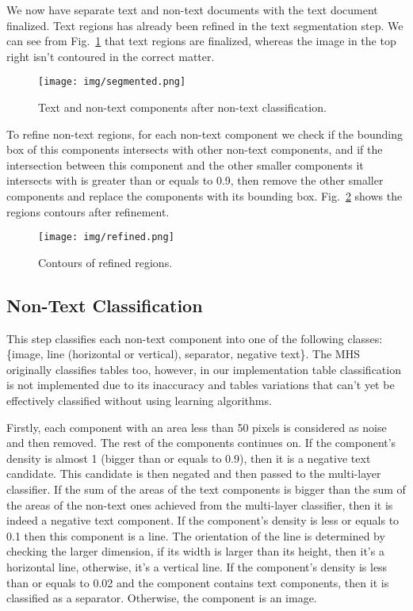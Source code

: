 \documentclass[conference]{IEEEtran}
\begin{document}
    We now have separate text and non-text documents with the text document finalized.
    Text regions has already been refined in the text segmentation step.
    We can see from Fig.~\ref{img:segmented} that text regions are finalized,
    whereas the image in the top right isn't contoured in the correct matter.

    \begin{figure}[htbp]
        \centerline{\texttt{[image: img/segmented.png]}}
        \caption{Text and non-text components after non-text classification.}
        \label{img:segmented}
    \end{figure}

    To refine non-text regions, for each non-text component we check if the bounding
    box of this components intersects with other non-text components, and if the
    intersection between this component and the other smaller components it intersects
    with is greater than or equals to 0.9, then remove the other smaller components and
    replace the components with its bounding box. Fig.~\ref{img:refined} shows the
    regions contours after refinement.

    \begin{figure}[htbp]
        \centerline{\texttt{[image: img/refined.png]}}
        \caption{Contours of refined regions.}
        \label{img:refined}
    \end{figure}

    \subsection{Non-Text Classification}

    This step classifies each non-text component into one of the following classes:
    \{image, line (horizontal or vertical), separator, negative text\}.
    The MHS originally classifies tables too, however, in our implementation table
    classification is not implemented due to its inaccuracy and tables variations
    that can't yet be effectively classified without using learning algorithms.
    
    Firstly, each component with an area less than 50 pixels is considered as noise
    and then removed.
    The rest of the components continues on.
    If the component's density is almost 1 (bigger than or equals to 0.9), then
    it is a negative text candidate.
    This candidate is then negated and then passed to the multi-layer classifier.
    If the sum of the areas of the text components is bigger than the sum of the
    areas of the non-text ones achieved from the multi-layer classifier, then it
    is indeed a negative text component.
    If the component's density is less or equals to 0.1 then this component is a line.
    The orientation of the line is determined by checking the larger dimension,
    if its width is larger than its height, then it's a horizontal line, otherwise, it's
    a vertical line.
    If the component's density is less than or equals to 0.02 and the component
    contains text components, then it is classified as a separator.
    Otherwise, the component is an image.
\end{document}

